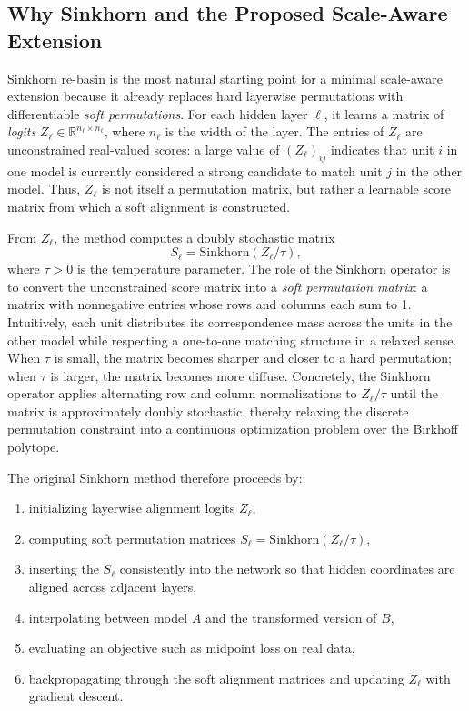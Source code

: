 \documentclass[11pt,a4paper]{article}
\begin{document}
\subsection{Why Sinkhorn and the Proposed Scale-Aware Extension}

Sinkhorn re-basin is the most natural starting point for a minimal scale-aware extension because it already replaces hard layerwise permutations with differentiable \emph{soft permutations}. For each hidden layer \(\ell\), it learns a matrix of \emph{logits} \(Z_\ell \in \mathbb{R}^{n_\ell \times n_\ell}\), where \(n_\ell\) is the width of the layer. The entries of \(Z_\ell\) are unconstrained real-valued scores: a large value of \((Z_\ell)_{ij}\) indicates that unit \(i\) in one model is currently considered a strong candidate to match unit \(j\) in the other model. Thus, \(Z_\ell\) is not itself a permutation matrix, but rather a learnable score matrix from which a soft alignment is constructed.

From \(Z_\ell\), the method computes a doubly stochastic matrix
\[
S_\ell = \mathrm{Sinkhorn}(Z_\ell / \tau),
\]
where \(\tau > 0\) is the temperature parameter. The role of the Sinkhorn operator is to convert the unconstrained score matrix into a \emph{soft permutation matrix}: a matrix with nonnegative entries whose rows and columns each sum to 1. Intuitively, each unit distributes its correspondence mass across the units in the other model while respecting a one-to-one matching structure in a relaxed sense. When \(\tau\) is small, the matrix becomes sharper and closer to a hard permutation; when \(\tau\) is larger, the matrix becomes more diffuse. Concretely, the Sinkhorn operator applies alternating row and column normalizations to \(Z_\ell / \tau\) until the matrix is approximately doubly stochastic, thereby relaxing the discrete permutation constraint into a continuous optimization problem over the Birkhoff polytope.

The original Sinkhorn method therefore proceeds by:
\begin{enumerate}
    \item initializing layerwise alignment logits \(Z_\ell\),
    \item computing soft permutation matrices \(S_\ell = \mathrm{Sinkhorn}(Z_\ell / \tau)\),
    \item inserting the \(S_\ell\) consistently into the network so that hidden coordinates are aligned across adjacent layers,
    \item interpolating between model \(A\) and the transformed version of \(B\),
    \item evaluating an objective such as midpoint loss on real data,
    \item backpropagating through the soft alignment matrices and updating \(Z_\ell\) with gradient descent.
\end{enumerate}
\end{document}
